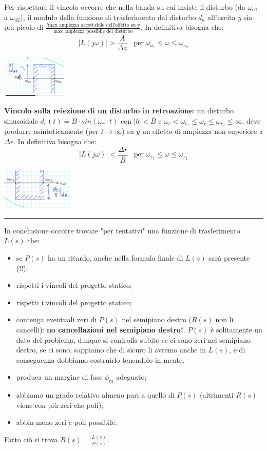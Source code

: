 \begin{landscape}
\begin{multicols*}{2}
    Per rispettare il vincolo occorre che nella banda su cui insiste il disturbo (da $\omega_{a1}$ a $\omega_{a2}$), il modulo della funzione di trasferimento dal disturbo $d_a$ all'uscita $y$ sia più picolo di $\frac{\text{"max ampiezza accettabile dell'effetto su y}}{\text{max ampiezza possibile del disturbo}}$.\newline
    In definitiva bisogna che:
    \[
        |L(j \omega)| > \frac{\bar{A}}{\Delta a} \;\;\;\text{per}\; \omega_{a_1} \leq \omega \leq \omega_{a_2}
    \]
    \begin{center}
        \includegraphics[height=2cm]{../formulario/img8.JPG}
    \end{center}
    \textbf{Vincolo sulla reiezione di un disturbo in retroazione}: un disturbo sinusoidale $d_r(t) = B \cdot  sin(\omega_r \cdot t)$ con $|b| < \bar{B}$ e $\omega_c < \omega_{r_1} \leq \omega_r \leq \omega_{r_2} \leq \infty$, deve produrre asintoticamente (per $t \rightarrow  \infty$) su $y$ un effetto di ampiezza non superiore a $\Delta r$. In definitiva bisogna che:
    \[
        |L(j \omega)| < \frac{\Delta r }{\bar{B}} \;\;\;\text{per}\; \omega_{r_1} \leq \omega \leq \omega_{r_2}
    \]
    \begin{center}
        \includegraphics[height=2cm]{../formulario/img9.JPG}
    \end{center}
    \rule{\textwidth}{0,4pt}
    In conclusione occorre trovare "per tentativi" una funzione di trasferimento $L(s)$ che:
    \begin{itemize}
        \item se $P(s)$ ha un ritardo, anche nella formula finale di $L(s)$ sarà presente (!!);
        \item rispetti i vincoli del progetto statico;
        \item rispetti i vincoli del progetto statico;
        \item contenga eventuali zeri di $P(s)$ nel semipiano destro ($R(s)$ non li cancelli): \textbf{no cancellazioni nel semipiano destro!}. $P(s)$ è solitamente un dato del problema, dunque si controlla subito se ci sono zeri nel semipiano destro, se ci sono, sappiamo che di sicuro li avremo anche in $L(s)$, e di conseguenza dobbiamo costruirlo tenendolo in mente.
        \item produca un margine di fase $\phi_m$ adeguato;
        \item abbiamo un grado relativo almeno pari a quello di $P(s)$ (altrimenti $R(s)$ viene con più zeri che poli);
        \item abbia meno zeri e poli possibile.
    \end{itemize}
    Fatto ciò si trova $R(s) = \frac{L(s)}{P(s)}$.\newline

\end{multicols*}
\end{landscape}
